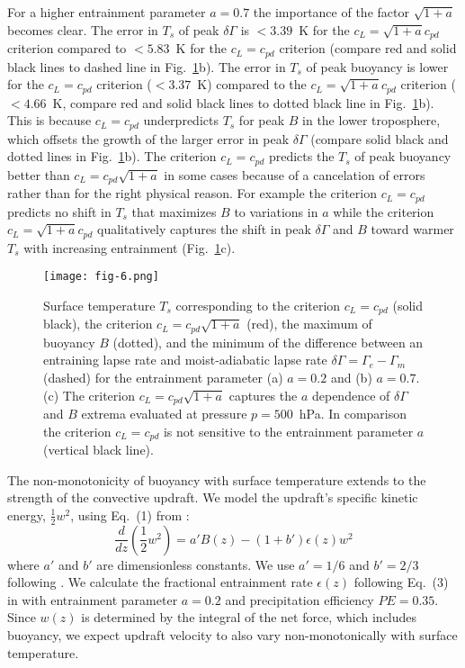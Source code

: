 \documentclass[draft]{ametsocV6.1}
\begin{document}
For a higher entrainment parameter $a=0.7$ the importance of the factor $\sqrt{1+a}$ becomes clear. The error in $T_s$ of peak $\delta \Gamma$ is $<3.39$~K for the $c_L=\sqrt{1+a}c_{pd}$ criterion compared to $<5.83$~K for the $c_L=c_{pd}$ criterion (compare red and solid black lines to dashed line in Fig.~\ref{fig:fig-6}b). The error in $T_s$ of peak buoyancy is lower for the $c_L=c_{pd}$ criterion ($<3.37$~K) compared to the $c_L=\sqrt{1+a}c_{pd}$ criterion ($<4.66$~K, compare red and solid black lines to dotted black line in Fig.~\ref{fig:fig-6}b). This is because $c_L=c_{pd}$ underpredicts $T_s$ for peak $B$ in the lower troposphere, which offsets the growth of the larger error in peak $\delta \Gamma$ (compare solid black and dotted lines in Fig.~\ref{fig:fig-6}b). The criterion $c_L=c_{pd}$ predicts the $T_s$ of peak buoyancy better than $c_L=c_{pd}\sqrt{1+a}$ in some cases because of a cancelation of errors rather than for the right physical reason. For example the criterion $c_L=c_{pd}$ predicts no shift in $T_s$ that maximizes $B$ to variations in $a$ while the criterion $c_L=\sqrt{1+a}c_{pd}$ qualitatively captures the shift in peak $\delta \Gamma$ and $B$ toward warmer $T_s$ with increasing entrainment (Fig.~\ref{fig:fig-6}c).

\begin{figure}[htbp]
 \centering
 \texttt{[image: fig-6.png]}\\
 \caption{Surface temperature $T_s$ corresponding to the criterion $c_L=c_{pd}$ (solid black), the criterion $c_L=c_{pd}\sqrt{1+a}$ (red), the maximum of buoyancy $B$ (dotted), and the minimum of the difference between an entraining lapse rate and moist-adiabatic lapse rate $\delta \Gamma = \Gamma_e - \Gamma_m$ (dashed) for the entrainment parameter (a) $a=0.2$ and (b) $a=0.7$. (c) The criterion $c_L=c_{pd}\sqrt{1+a}$ captures the $a$ dependence of $\delta \Gamma$ and $B$ extrema evaluated at pressure $p=500$~hPa. In comparison the criterion $c_L=c_{pd}$ is not sensitive to the entrainment parameter $a$ (vertical black line).}\label{fig:fig-6}
\end{figure}

The non-monotonicity of buoyancy with surface temperature extends to the strength of the convective updraft. We model the updraft's specific kinetic energy, $\frac{1}{2}w^2$, using Eq.~(1) from \cite{delgenio2007}:
\begin{equation}
\frac{d}{dz}\left(\frac{1}{2}w^2\right)=a'B(z)-(1+b')\epsilon(z)w^2 \label{eq:momentum}
\end{equation}
where $a'$ and $b'$ are dimensionless constants. We use $a'=1/6$ and $b'=2/3$ following \cite{delgenio2007}. We calculate the fractional entrainment rate $\epsilon(z)$ following Eq.~(3) in \cite{romps2016} with entrainment parameter $a=0.2$ and precipitation efficiency $PE=0.35$. Since $w(z)$ is determined by the integral of the net force, which includes buoyancy, we expect updraft velocity to also vary non-monotonically with surface temperature.
\end{document}
